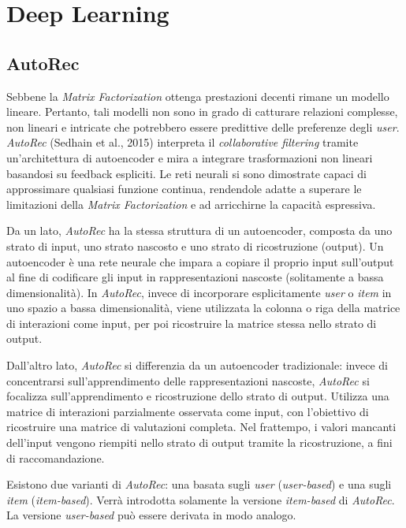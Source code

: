 \section{Deep Learning}

\subsection{AutoRec}\label{autorec}
Sebbene la \textit{Matrix Factorization} ottenga prestazioni decenti rimane un modello lineare. Pertanto, tali modelli non sono in grado di catturare relazioni complesse, non lineari e intricate che potrebbero essere predittive delle preferenze degli \textit{user}. \textit{AutoRec} (Sedhain et al., 2015) interpreta il \textit{collaborative filtering} tramite un'architettura di autoencoder e mira a integrare trasformazioni non lineari basandosi su feedback espliciti. Le reti neurali si sono dimostrate capaci di approssimare qualsiasi funzione continua, rendendole adatte a superare le limitazioni della \textit{Matrix Factorization} e ad arricchirne la capacità espressiva.

Da un lato, \textit{AutoRec} ha la stessa struttura di un autoencoder, composta da uno strato di input, uno strato nascosto e uno strato di ricostruzione (output). Un autoencoder è una rete neurale che impara a copiare il proprio input sull'output al fine di codificare gli input in rappresentazioni nascoste (solitamente a bassa dimensionalità). In \textit{AutoRec}, invece di incorporare esplicitamente \textit{user} o \textit{item} in uno spazio a bassa dimensionalità, viene utilizzata la colonna o riga della matrice di interazioni come input, per poi ricostruire la matrice stessa nello strato di output.

Dall'altro lato, \textit{AutoRec} si differenzia da un autoencoder tradizionale: invece di concentrarsi sull'apprendimento delle rappresentazioni nascoste, \textit{AutoRec} si focalizza sull'apprendimento e ricostruzione dello strato di output. Utilizza una matrice di interazioni parzialmente osservata come input, con l'obiettivo di ricostruire una matrice di valutazioni completa. Nel frattempo, i valori mancanti dell'input vengono riempiti nello strato di output tramite la ricostruzione, a fini di raccomandazione.

Esistono due varianti di \textit{AutoRec}: una basata sugli \textit{user} (\textit{user-based}) e una sugli \textit{item} (\textit{item-based}). Verrà introdotta solamente la versione \textit{item-based} di \textit{AutoRec}. La versione \textit{user-based} può essere derivata in modo analogo.


